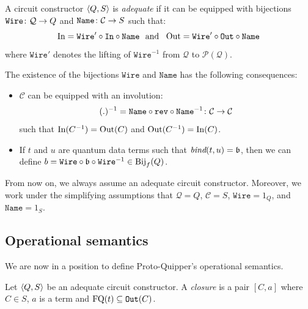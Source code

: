 \documentclass[twoside]{article}
\begin{document}
\begin{definition}
A circuit constructor $\langle Q,S\rangle$ is \emph{adequate} if it can 
be equipped with bijections $\mathtt{Wire}\colon \mathcal{Q} \to Q$ 
and $\mathtt{Name}\colon \mathcal{C} \to S$ such that:
\[\mathop{\textrm{In}}\nolimits=\mathtt{Wire}' \circ\mathtt{In}\circ \mathtt{Name} 
~\mbox{ and }~ 
\mathop{\textrm{Out}}\nolimits=\mathtt{Wire}'\circ\mathtt{Out}\circ \mathtt{Name}
\]
where $\mathtt{Wire}'$ denotes the lifting of $\mathtt{Wire}^{-1}$ 
from $\mathcal{Q}$ to $\mathcal{P}(\mathcal{Q})$.
\end{definition}

\begin{remark}
\label{structure-transfer}
The existence of the bijections $\mathtt{Wire}$ and $\mathtt{Name}$ has 
the following consequences:
\begin{itemize}
  \item $\mathcal{C}$ can be equipped with an involution:
\[
(.)^{-1} = \mathtt{Name}\circ \mathtt{rev} \circ \mathtt{Name}^{-1}
           \colon \mathcal{C}\to\mathcal{C}
\]
such that $\mathop{\textrm{In}}\nolimits(C^{-1})=\mathop{\textrm{Out}}\nolimits(C)$ and 
$\mathop{\textrm{Out}}\nolimits(C^{-1})=\mathop{\textrm{In}}\nolimits(C)$.
  \item If $t$ and $u$ are quantum data terms such that 
  $\mathop{\textit{bind}}\nolimits(t,u)=\mathfrak{b}$, then we can define 
  $b = \mathtt{Wire}\circ \mathfrak{b}\circ \mathtt{Wire}^{-1}
  \in \textrm{\rm Bij}_f(Q)$.
\end{itemize}

From now on, we always assume an adequate circuit constructor. Moreover, we work 
under the simplifying assumptions that $\mathcal{Q}=Q$,
$\mathcal{C}=S$, $\mathtt{Wire}=1_Q$, and $\mathtt{Name}=1_S$.
\end{remark}


\subsection{Operational semantics}

We are now in a position to define Proto-Quipper's operational 
semantics.

\begin{definition}
Let $\langle Q,S\rangle$ be an adequate circuit constructor. A 
\emph{closure} is a pair $[C,a]$ where $C\in S$, $a$ is a 
term and $\mathop{\textrm{FQ}}\nolimits(t)\subseteq\mathtt{Out}(C)$. 
\end{definition}

\end{document}
